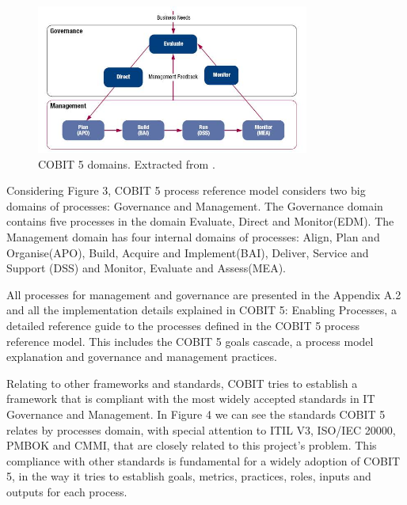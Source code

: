\begin{figure}
\centering
\includegraphics[width=0.8\textwidth]{img/COBITProcesses.jpg}
\caption{COBIT 5 domains. Extracted from \cite{2012cobit}.}
\end{figure}

Considering Figure 3, COBIT 5 process reference model considers two big domains of processes: Governance and Management. The Governance domain contains five processes in the domain Evaluate, Direct and Monitor(EDM). The Management domain has four internal domains of processes: Align, Plan and Organise(APO), Build, Acquire and Implement(BAI), Deliver, Service and Support (DSS) and Monitor, Evaluate and Assess(MEA).\par
All processes for management and governance are presented in the Appendix A.2 and all the implementation details explained in COBIT 5: Enabling Processes\cite{2012cobitEP}, a detailed reference guide to the processes defined in the COBIT 5 process reference model. This includes the COBIT 5 goals cascade, a process model explanation and governance and management practices.\par
Relating to other frameworks and standards, COBIT tries to establish a framework that is compliant with the most widely accepted standards in IT Governance and Management. In Figure 4 we can see the standards COBIT 5 relates by processes domain, with special attention to ITIL V3\cite{itilSS,itilSD,itilSO,itilST,itilCSI}, ISO/IEC 20000\cite{ISO20000-1}, PMBOK\cite{pmbok5} and CMMI\cite{cmmi}, that are closely related to this project's problem. This compliance with other standards is fundamental for a widely adoption of COBIT 5, in the way it tries to establish goals, metrics, practices, roles, inputs and outputs for each process.\par

